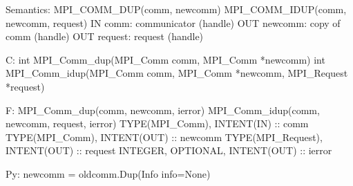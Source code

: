 Semantics:
MPI_COMM_DUP(comm, newcomm)
MPI_COMM_IDUP(comm, newcomm, request)
IN comm: communicator (handle)
OUT newcomm: copy of comm (handle)
OUT request: request (handle)

C:
int MPI_Comm_dup(MPI_Comm comm, MPI_Comm *newcomm)
int MPI_Comm_idup(MPI_Comm comm, MPI_Comm *newcomm, MPI_Request *request)

F:
MPI_Comm_dup(comm, newcomm, ierror)
MPI_Comm_idup(comm, newcomm, request, ierror)
TYPE(MPI_Comm), INTENT(IN) :: comm
TYPE(MPI_Comm), INTENT(OUT) :: newcomm
TYPE(MPI_Request), INTENT(OUT) :: request
INTEGER, OPTIONAL, INTENT(OUT) :: ierror

Py:
newcomm = oldcomm.Dup(Info info=None)
